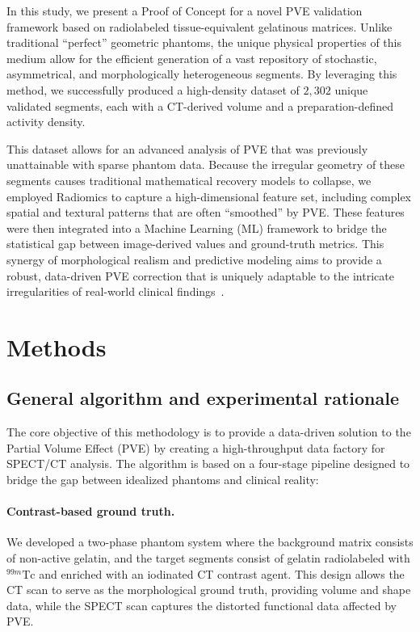 In this study, we present a Proof of Concept for a novel PVE validation framework based on radiolabeled tissue-equivalent gelatinous matrices.
Unlike traditional ``perfect'' geometric phantoms, the unique physical properties of this medium allow for the efficient generation of a vast repository of stochastic, asymmetrical, and morphologically heterogeneous segments.
By leveraging this method, we successfully produced a high-density dataset of $2{,}302$ unique validated segments, each with a CT-derived volume and a preparation-defined activity density.

This dataset allows for an advanced analysis of PVE that was previously unattainable with sparse phantom data.
Because the irregular geometry of these segments causes traditional mathematical recovery models to collapse, we employed Radiomics to capture a high-dimensional feature set, including complex spatial and textural patterns that are often ``smoothed'' by PVE.
These features were then integrated into a Machine Learning (ML) framework to bridge the statistical gap between image-derived values and ground-truth metrics.
This synergy of morphological realism and predictive modeling aims to provide a robust, data-driven PVE correction that is uniquely adaptable to the intricate irregularities of real-world clinical findings~\citep{salmon2018quantitative,trangia2019characterization,southekal2012evaluation,matsubara2020model,denijs2014improving}.

\section{Methods}

\subsection{General algorithm and experimental rationale}

The core objective of this methodology is to provide a data-driven solution to the Partial Volume Effect (PVE) by creating a high-throughput data factory for SPECT/CT analysis.
The algorithm is based on a four-stage pipeline designed to bridge the gap between idealized phantoms and clinical reality:

\paragraph{Contrast-based ground truth.}
We developed a two-phase phantom system where the background matrix consists of non-active gelatin, and the target segments consist of gelatin radiolabeled with $^{99m}\mathrm{Tc}$ and enriched with an iodinated CT contrast agent.
This design allows the CT scan to serve as the morphological ground truth, providing volume and shape data, while the SPECT scan captures the distorted functional data affected by PVE.

